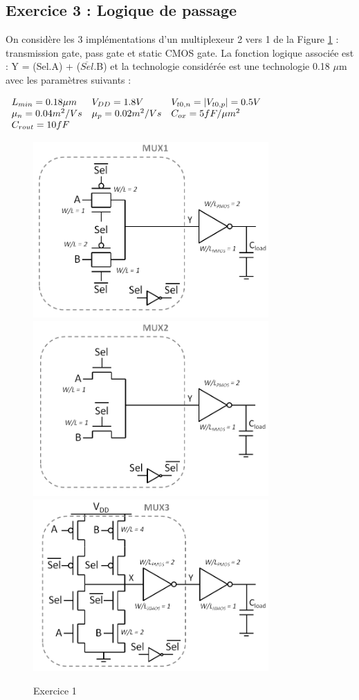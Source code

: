 \documentclass[paper=a4, fontsize=11pt]{article} %
\numberwithin{equation}{section} %
\numberwithin{figure}{section} %
\numberwithin{table}{section} %
\begin{document}
\subsection*{Exercice 3 : Logique de passage}
On considère les 3 implémentations d'un multiplexeur 2 vers 1 de la Figure \ref{fig7-3} : transmission gate, pass gate et static CMOS gate. La fonction logique associée est : Y = (Sel.A) + ($\overline{Sel}$.B) et la technologie considérée est une technologie 0.18 $\mu$m avec les paramètres suivants :
\begin{center}
$
	\begin{array}{l l l}
	L_{min} = 0.18 \mu m 	& V_{DD} = 1.8 V 						&V_{t0,n} = |V_{t0,p} | = 0.5 V\\
		\mu_n = 0.04 m^2/Vs 		&\mu_p = 0.02 m^2/Vs	& C_{ox} = 5 fF/\mu m^2\\
		C_{rout} = 10fF&&\\
	\end{array}
	$
\end{center}

\begin{figure}[!htbp]
   \centering
   \includegraphics[width=9cm]{figure/fig7-3-1.png}
	 \includegraphics[width=9cm]{figure/fig7-3-2.png}
	 \includegraphics[width=9cm]{figure/fig7-3-3.png}
   \caption{Exercice 1}
   \label{fig7-3}
\end{figure}
\end{document}

